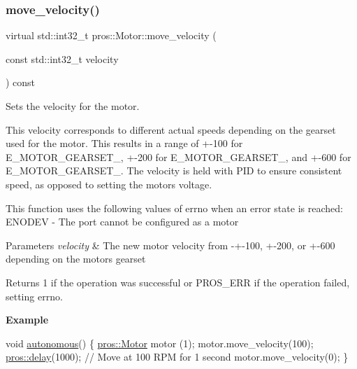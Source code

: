 \subsubsection{\texorpdfstring{move\+\_\+velocity()}{move\_velocity()}}
{\footnotesize\ttfamily virtual std\+::int32\+\_\+t pros\+::\+Motor\+::move\+\_\+velocity (\begin{DoxyParamCaption}\item[{const std\+::int32\+\_\+t}]{velocity }\end{DoxyParamCaption}) const\hspace{0.3cm}{\ttfamily [virtual]}}



Sets the velocity for the motor. 

This velocity corresponds to different actual speeds depending on the gearset used for the motor. This results in a range of +-\/100 for E\+\_\+\+M\+O\+T\+O\+R\+\_\+\+G\+E\+A\+R\+S\+E\+T\+\_, +-\/200 for E\+\_\+\+M\+O\+T\+O\+R\+\_\+\+G\+E\+A\+R\+S\+E\+T\+\_, and +-\/600 for E\+\_\+\+M\+O\+T\+O\+R\+\_\+\+G\+E\+A\+R\+S\+E\+T\+\_. The velocity is held with P\+ID to ensure consistent speed, as opposed to setting the motor\textquotesingle{}s voltage.

This function uses the following values of errno when an error state is reached\+: E\+N\+O\+D\+EV -\/ The port cannot be configured as a motor


\begin{DoxyParams}{Parameters}
{\em velocity} & The new motor velocity from -\/+-\/100, +-\/200, or +-\/600 depending on the motor\textquotesingle{}s gearset\\
\hline
\end{DoxyParams}
\begin{DoxyReturn}{Returns}
1 if the operation was successful or P\+R\+O\+S\+\_\+\+E\+RR if the operation failed, setting errno.
\end{DoxyReturn}
{\bfseries Example} 
\begin{DoxyCode}
\textcolor{keywordtype}{void} \hyperlink{main_8h_a2df3d06bc5bced154da27fce393f991f}{autonomous}() \{
  \hyperlink{classpros_1_1Motor}{pros::Motor} motor (1);
  motor.move\_velocity(100);
  \hyperlink{rtos_8h_ab8c5a8048d5576a33d7f79b95a2fa0dd}{pros::delay}(1000); \textcolor{comment}{// Move at 100 RPM for 1 second}
  motor.move\_velocity(0);
\}
\end{DoxyCode}
 \mbox{\label{classpros_1_1Motor_a3c79db57c20617fbbc49461c58612cfb}} 
